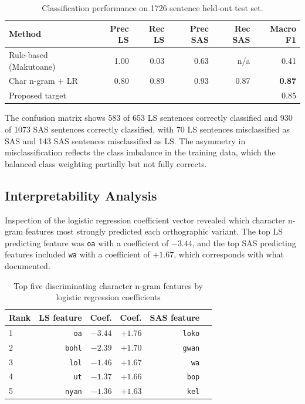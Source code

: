 \documentclass[12pt]{ThesisRU}
\begin{document}
\begin{table}[ht]
    \centering
    \begin{tabular}{lrrrrr}
     \toprule
    \textbf{Method} & \textbf{Prec LS} & \textbf{Rec LS}
                    & \textbf{Prec SAS} & \textbf{Rec SAS}
                    & \textbf{Macro F1} \\
    \midrule
    Rule-based (Makutoane) & 1.00 & 0.03 & 0.63 & n/a & 0.41 \\
    Char n-gram + LR       & 0.80 & 0.89 & 0.93 & 0.87 &
                             \textbf{0.87} \\
    \midrule
    Proposed target        &      &      &      &      & 0.85 \\
    \bottomrule     
    \end{tabular}
    \caption{Classification performance on 1726 sentence held-out test set.}
    \label{tab:clf_compare}
\end{table}

The confusion matrix shows 583 of 653 LS sentences correctly classified and 930 of 1073 SAS sentences correctly classified, with 70 LS sentences misclassified as SAS and 143 SAS sentences misclassified as LS. The asymmetry in misclassification reflects the class imbalance in the training data, which the balanced class weighting partially but not fully corrects.

\subsection{Interpretability Analysis}

Inspection of the logistic regression coefficient vector revealed which character n-gram features most strongly predicted each orthographic variant. The top LS predicting feature was \texttt{oa} with a coefficient of $-3.44$, and the top SAS predicting features included \texttt{wa} with a coefficient of $+1.67$, which corresponds with what \citet{makutoane2022people} documented.

\begin{table}[ht]
    \centering
    \begin{tabular}{lrrrrr}
     \toprule
        \textbf{Rank} & \textbf{LS feature} & \textbf{Coef.}
                      & \textbf{Coef.} & \textbf{SAS feature} \\
        \midrule
        1 & \texttt{oa}   & $-3.44$ & $+1.76$ & \texttt{loko} \\
        2 & \texttt{bohl} & $-2.39$ & $+1.70$ & \texttt{gwan} \\
        3 & \texttt{lol}  & $-1.46$ & $+1.67$ & \texttt{wa}   \\
        4 & \texttt{ut}   & $-1.37$ & $+1.66$ & \texttt{bop}  \\
        5 & \texttt{nyan} & $-1.36$ & $+1.63$ & \texttt{kel}  \\
    \bottomrule
    \end{tabular}
    \caption{Top five discriminating character n-gram features by logistic regression coefficients}
    \label{tab:clf_compare}
\end{table}
\end{document}
